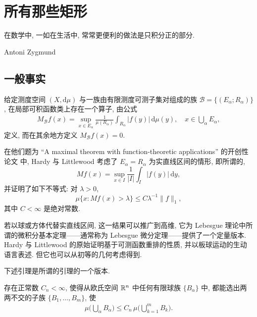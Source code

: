 
\chapter{所有那些矩形}

\epigraph{在数学中, 一如在生活中, 常常更便利的做法是只积分正的部分.}{Antoni Zygmund}

\section{一般事实}

给定测度空间 $(X, \mathrm{d}\mu)$ 与一族由有限测度可测子集对组成的族 $\mathcal{B} = \{(E_\alpha; R_\alpha)\}$, 在局部可积函数类上存在一个算子, 由公式
\begin{align*}
  M_{\mathcal{B}}f(x)=\sup_{x\in E_{\alpha}}\frac{1}{\mu(R_{\alpha})}\int_{R_{\alpha}}|f(y)|\,\mathrm{d}\mu(y),\quad x\in\bigcup_{\alpha}E_{\alpha},
\end{align*}
定义, 而在其余地方定义 $M_{\mathcal{B}}f(x) = 0$.

在他们题为 ``A maximal theorem with function-theoretic applications'' 的开创性论文 \cite{b48} 中, Hardy 与 Littlewood 考虑了 $E_{\alpha} = R_{\alpha}$ 为实直线区间的情形, 即所谓的,
\begin{equation}\label{eq:2.1}
  M f(x)=\sup_{x\in I}\frac{1}{\left|I\right|}\int_{I}\left|f(y)\right|\,\mathrm{d}y,
\end{equation}
并证明了如下不等式: 对 $\lambda > 0$,
\begin{equation}\label{eq:2.2}
  \mu\{x:Mf(x)>\lambda\}\leq C\lambda^{-1}\|f\|_{1},
\end{equation}
其中 $C<\infty$ 是绝对常数.

若以球或方体代替实直线区间, 这一结果可以推广到高维, 它为 Lebesgue 理论中所谓的微积分基本定理——通常称为 Lebesgue 微分定理——提供了一个定量版本. Hardy 与 Littlewood 的原始证明基于可测函数重排的性质, 并以板球运动的生动语言表述. 但它也可以从初等的几何考虑得到.

下述引理是所谓的引理的一个版本.

\begin{lemma}\label{lem:2.1}
存在正常数 $C_n < \infty$, 使得从欧氏空间 $\mathbb{R}^n$ 中任何有限球族 $\{B_\alpha\}$ 中, 都能选出两两不交的子族 $\{B_{1}, \ldots, B_{m}\}$, 使
\begin{align*}
  \mu\Big(\bigcup_{\alpha}B_{\alpha}\Big)\leq C_{n}\,\mu\Big(\bigcup_{k=1}^{m}B_{k}\Big).
\end{align*}
\end{lemma}


